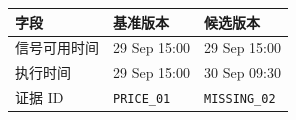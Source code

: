\begin{tabular}{@{}P{3.7cm}P{4.3cm}P{4.3cm}@{}}
\toprule
\textbf{字段} & \textbf{基准版本} & \textbf{候选版本} \\
\midrule
信号可用时间 & 29 Sep 15:00 & 29 Sep 15:00 \\
执行时间 & 29 Sep 15:00 & 30 Sep 09:30 \\
证据 ID & \texttt{PRICE\_01} & \texttt{MISSING\_02} \\
\bottomrule
\end{tabular}
